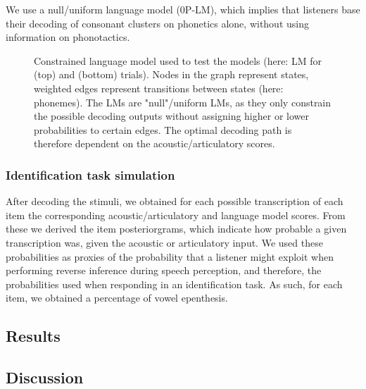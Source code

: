 We use a null/uniform language model (\textsc{0P-LM}), which implies that listeners base their decoding of consonant clusters on phonetics alone, without using information on phonotactics.

\begin{figure*}[htb]
\centering
\vspace{0.5cm}
\caption{Constrained language model used to test the models (here: LM for  (top) and  (bottom) trials). Nodes in the graph represent states, weighted edges represent transitions between states (here: phonemes). The LMs are "null"/uniform LMs, as they only constrain the possible decoding outputs without assigning higher or lower probabilities to certain edges. The optimal decoding path is therefore dependent on the acoustic/articulatory scores.}
\label{fig:G_fst}
\end{figure*}

\subsubsection{Identification task simulation}
After decoding the stimuli, we obtained for each possible transcription of each item the corresponding acoustic/articulatory and language model scores. From these we derived the item posteriorgrams, which indicate how probable a given transcription was, given the acoustic or articulatory input. We used these probabilities as proxies of the probability that a listener might exploit when performing reverse inference during speech perception, and therefore, the probabilities used when responding in an identification task. As such, for each item, we obtained a percentage of vowel epenthesis.

\subsection{Results}
\subsection{Discussion}


